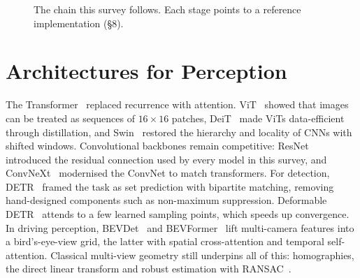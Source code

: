 \documentclass[11pt]{article}
\begin{document}
\begin{figure}[t]
\centering
{}
\caption{The chain this survey follows. Each stage points to a reference implementation (\S8).}
\label{fig:chain}
\end{figure}

\section{Architectures for Perception}

The Transformer~\cite{vaswani2017attention} replaced recurrence with attention. ViT~\cite{dosovitskiy2021vit}
showed that images can be treated as sequences of $16\times16$ patches, DeiT~\cite{touvron2021deit}
made ViTs data-efficient through distillation, and Swin~\cite{liu2021swin} restored the
hierarchy and locality of CNNs with shifted windows. Convolutional backbones remain
competitive: ResNet~\cite{he2016resnet} introduced the residual connection used by every
model in this survey, and ConvNeXt~\cite{liu2022convnext} modernised the ConvNet to match
transformers. For detection, DETR~\cite{carion2020detr} framed the task as set prediction
with bipartite matching, removing hand-designed components such as non-maximum suppression.
Deformable DETR~\cite{zhu2021deformable} attends to a few learned sampling points, which speeds
up convergence. In driving perception, BEVDet~\cite{huang2021bevdet} and BEVFormer~\cite{li2022bevformer}
lift multi-camera features into a bird's-eye-view grid, the latter with spatial
cross-attention and temporal self-attention. Classical multi-view geometry still
underpins all of this: homographies, the direct linear transform and robust estimation
with RANSAC~\cite{hartley2004mvg,fischler1981ransac}.
\end{document}
